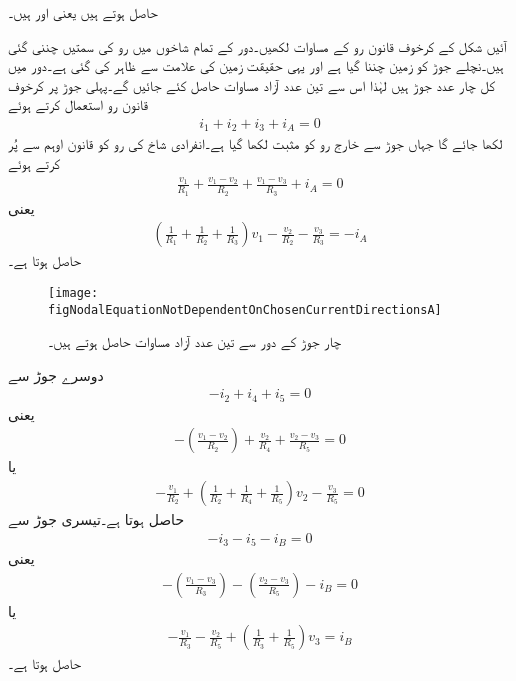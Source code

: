 حاصل ہوتے ہیں یعنی  اور  ہیں۔

آئیں شکل  کے کرخوف قانون رو  کے مساوات لکھیں۔دور کے تمام شاخوں میں رو کی سمتیں چننی گئی ہیں۔نچلے جوڑ کو زمین چننا گیا ہے اور یہی حقیقت زمین کی علامت سے ظاہر کی گئی ہے۔دور میں کل چار  عدد جوڑ ہیں لہٰذا اس سے تین  عدد آزاد مساوات حاصل کئے جائیں گے۔پہلی جوڑ پر کرخوف قانون رو استعمال کرتے ہوئے
\begin{align*}
i_1+i_2+i_3+i_A=0
\end{align*}
لکھا جائے گا جہاں جوڑ سے خارج رو کو مثبت لکھا گیا ہے۔انفرادی شاخ کی رو کو قانون اوہم سے پُر کرتے ہوئے
\begin{align*}
\frac{v_1}{R_1}+\frac{v_1-v_2}{R_2}+\frac{v_1-v_3}{R_3}+i_A=0
\end{align*}
یعنی
\begin{align}\label{مساوات_جوڑ_چار_جوڑ_تین_آزاد_الف}
\left(\frac{1}{R_1}+\frac{1}{R_2}+\frac{1}{R_3}\right)v_1-\frac{v_2}{R_2}-\frac{v_3}{R_3}=-i_A
\end{align}
حاصل ہوتا ہے۔
\begin{figure}
\centering
\texttt{[image: figNodalEquationNotDependentOnChosenCurrentDirectionsA]}
\caption{چار جوڑ کے دور سے تین عدد آزاد مساوات حاصل ہوتے ہیں۔}
\label{شکل_جوڑ_چار_جوڑ_تین_آزاد_مساوات_الف}
\end{figure}
دوسرے جوڑ سے
\begin{align*}
-i_2+i_4+i_5=0
\end{align*}
یعنی
\begin{align*}
-\left(\frac{v_1-v_2}{R_2}\right)+\frac{v_2}{R_4}+\frac{v_2-v_3}{R_5}=0
\end{align*}
یا
\begin{align}\label{مساوات_جوڑ_چار_جوڑ_تین_آزاد_ب}
-\frac{v_1}{R_2}+\left(\frac{1}{R_2}+\frac{1}{R_4}+\frac{1}{R_5}\right)v_2-\frac{v_3}{R_5}=0
\end{align}
حاصل ہوتا ہے۔تیسری جوڑ سے
\begin{align*}
-i_3-i_5-i_B=0
\end{align*}
یعنی
\begin{align*}
-\left(\frac{v_1-v_3}{R_3}\right)-\left(\frac{v_2-v_3}{R_5}\right)-i_B=0
\end{align*}
یا
\begin{align}\label{مساوات_جوڑ_چار_جوڑ_تین_آزاد_پ}
-\frac{v_1}{R_3}-\frac{v_2}{R_5}+\left(\frac{1}{R_3}+\frac{1}{R_5}\right)v_3=i_B
\end{align}
حاصل ہوتا ہے۔

